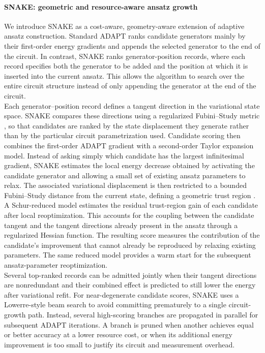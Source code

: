 \documentclass[
  reprint,
  amsmath,
  amssymb,
  aps,
  pra,
  nofootinbib,
  superscriptaddress,
  floatfix
]{revtex4-2}
\begin{document}
\paragraph*{\textsc{SNAKE}: geometric and resource-aware ansatz growth}
We introduce \textsc{SNAKE} as a cost-aware, geometry-aware extension of adaptive ansatz construction. Standard ADAPT ranks candidate generators mainly by their first-order energy gradients and appends the selected generator to the end of the circuit. In contrast, \textsc{SNAKE} ranks generator-position records, where each record specifies both the generator to be added and the position at which it is inserted into the current ansatz. This allows the algorithm to search over the entire circuit structure instead of only appending the generator at the end of the circuit.\\
Each generator--position record defines a tangent direction in the variational state space. \textsc{SNAKE} compares these directions using a regularized Fubini--Study metric \cite{Sohail2026GeoADAPT}, so that candidates are ranked by the state displacement they generate rather than by the particular circuit parametrization used. 
Candidate scoring then combines the first-order ADAPT gradient with a second-order Taylor expansion model. Instead of asking simply which candidate has the largest infinitesimal gradient, \textsc{SNAKE} estimates the local energy decrease obtained by activating the candidate generator and allowing a small set of existing ansatz parameters to relax. The associated variational displacement is then restricted to a bounded Fubini--Study distance from the current state, defining a geometric trust region \cite{Nocedal2006TrustRegion}.\\
A Schur-reduced model estimates the residual trust-region gain of each candidate after local reoptimization. This accounts for the coupling between the candidate tangent and the tangent directions already present in the ansatz through a regularized Hessian function. The resulting score measures the contribution of the candidate's improvement that cannot already be reproduced by relaxing existing parameters. The same reduced model provides a warm start for the subsequent ansatz-parameter reoptimization.\\
Several top-ranked records can be admitted jointly when their tangent directions are nonredundant and their combined effect is predicted to still lower the energy after variational refit. For near-degenerate candidate scores, \textsc{SNAKE} uses a Lowerre-style beam search to avoid committing prematurely to a single circuit-growth path\cite{Lowerre1976Beam}. Instead, several high-scoring branches are propagated in parallel for subsequent ADAPT iterations. A branch is pruned when another achieves equal or better accuracy at a lower resource cost, or when its additional energy improvement is too small to justify its circuit and measurement overhead.\\
\end{document}
